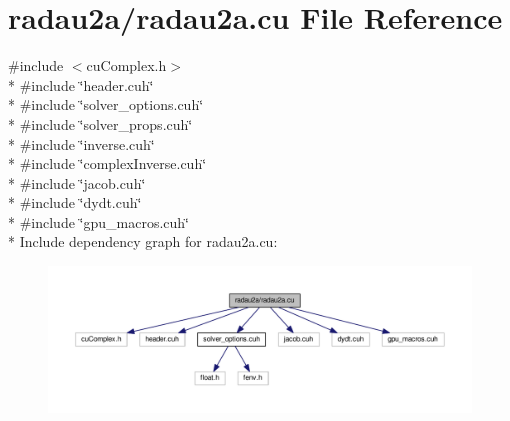 \hypertarget{radau2a_8cu}{}\section{radau2a/radau2a.cu File Reference}
\label{radau2a_8cu}
{\ttfamily \#include $<$cu\+Complex.\+h$>$}\\*
{\ttfamily \#include \char`\"{}header.\+cuh\char`\"{}}\\*
{\ttfamily \#include \char`\"{}solver\+\_\+options.\+cuh\char`\"{}}\\*
{\ttfamily \#include \char`\"{}solver\+\_\+props.\+cuh\char`\"{}}\\*
{\ttfamily \#include \char`\"{}inverse.\+cuh\char`\"{}}\\*
{\ttfamily \#include \char`\"{}complex\+Inverse.\+cuh\char`\"{}}\\*
{\ttfamily \#include \char`\"{}jacob.\+cuh\char`\"{}}\\*
{\ttfamily \#include \char`\"{}dydt.\+cuh\char`\"{}}\\*
{\ttfamily \#include \char`\"{}gpu\+\_\+macros.\+cuh\char`\"{}}\\*
Include dependency graph for radau2a.\+cu\+:
\nopagebreak
\begin{figure}[H]
\begin{center}
\leavevmode
\includegraphics[width=350pt]{radau2a_8cu__incl}
\end{center}
\end{figure}
